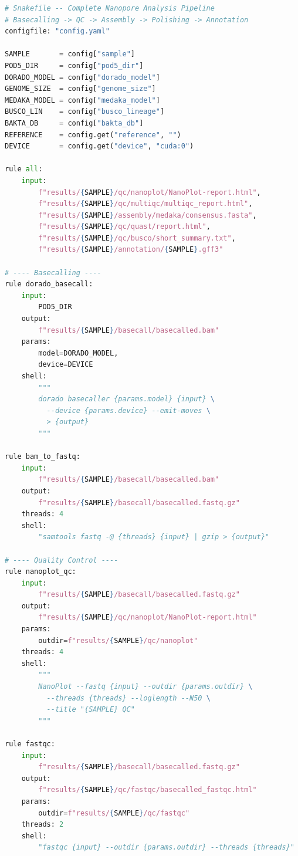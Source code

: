 \begin{lstlisting}[language=Python,caption={Complete end-to-end Snakemake workflow for nanopore analysis (Snakefile).},label=lst:diy-smk-e2e]
# Snakefile -- Complete Nanopore Analysis Pipeline
# Basecalling -> QC -> Assembly -> Polishing -> Annotation
configfile: "config.yaml"

SAMPLE       = config["sample"]
POD5_DIR     = config["pod5_dir"]
DORADO_MODEL = config["dorado_model"]
GENOME_SIZE  = config["genome_size"]
MEDAKA_MODEL = config["medaka_model"]
BUSCO_LIN    = config["busco_lineage"]
BAKTA_DB     = config["bakta_db"]
REFERENCE    = config.get("reference", "")
DEVICE       = config.get("device", "cuda:0")

rule all:
    input:
        f"results/{SAMPLE}/qc/nanoplot/NanoPlot-report.html",
        f"results/{SAMPLE}/qc/multiqc/multiqc_report.html",
        f"results/{SAMPLE}/assembly/medaka/consensus.fasta",
        f"results/{SAMPLE}/qc/quast/report.html",
        f"results/{SAMPLE}/qc/busco/short_summary.txt",
        f"results/{SAMPLE}/annotation/{SAMPLE}.gff3"

# ---- Basecalling ----
rule dorado_basecall:
    input:
        POD5_DIR
    output:
        f"results/{SAMPLE}/basecall/basecalled.bam"
    params:
        model=DORADO_MODEL,
        device=DEVICE
    shell:
        """
        dorado basecaller {params.model} {input} \
          --device {params.device} --emit-moves \
          > {output}
        """

rule bam_to_fastq:
    input:
        f"results/{SAMPLE}/basecall/basecalled.bam"
    output:
        f"results/{SAMPLE}/basecall/basecalled.fastq.gz"
    threads: 4
    shell:
        "samtools fastq -@ {threads} {input} | gzip > {output}"

# ---- Quality Control ----
rule nanoplot_qc:
    input:
        f"results/{SAMPLE}/basecall/basecalled.fastq.gz"
    output:
        f"results/{SAMPLE}/qc/nanoplot/NanoPlot-report.html"
    params:
        outdir=f"results/{SAMPLE}/qc/nanoplot"
    threads: 4
    shell:
        """
        NanoPlot --fastq {input} --outdir {params.outdir} \
          --threads {threads} --loglength --N50 \
          --title "{SAMPLE} QC"
        """

rule fastqc:
    input:
        f"results/{SAMPLE}/basecall/basecalled.fastq.gz"
    output:
        f"results/{SAMPLE}/qc/fastqc/basecalled_fastqc.html"
    params:
        outdir=f"results/{SAMPLE}/qc/fastqc"
    threads: 2
    shell:
        "fastqc {input} --outdir {params.outdir} --threads {threads}"


\end{lstlisting}
